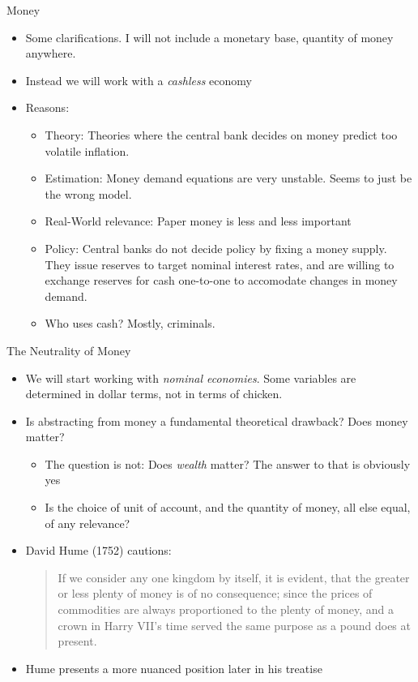 \documentclass[11pt,aspectratio=169,xcolor={dvipsnames},hyperref={pdftex,pdfpagemode=UseNone,hidelinks,pdfdisplaydoctitle=true},usepdftitle=false]{beamer}
\begin{document}
\begin{frame}{Money}
\begin{itemize}
\item Some clarifications. I will not include a monetary base, quantity of money anywhere.
\item Instead we will work with a \textit{cashless} economy
\item Reasons:
\begin{itemize}
\item Theory: Theories where the central bank decides on money predict too volatile inflation.
\item Estimation: Money demand equations are very unstable. Seems to just be the wrong model.
\item Real-World relevance: Paper money is less and less important
\item Policy: Central banks do not decide policy by fixing a money supply. They issue reserves to target nominal interest rates, and are willing to exchange reserves for cash one-to-one to accomodate changes in money demand.
\item Who uses cash? Mostly, criminals.
\end{itemize}
\end{itemize}
\end{frame}

\begin{frame}{The Neutrality of Money}
\begin{itemize}
\item We will start working with \textit{nominal economies}. Some variables are determined in dollar terms, not in terms of chicken.
\item Is abstracting from money a fundamental theoretical drawback? Does money matter?
\begin{itemize}
\item The question is not: Does \textit{wealth} matter? The answer to that is obviously yes
\item Is the choice of unit of account, and the quantity of money, all else equal, of any relevance?
\end{itemize}
\item David Hume (1752) cautions:\\
\begin{quote}
\vspace{0.5cm}
If we consider any one kingdom by itself, it is evident, that the greater or less plenty
of money is of no consequence; since the prices of commodities are always proportioned to
the plenty of money, and a crown in Harry VII's time served the same purpose as a pound
does at present.
\end{quote}
\item Hume presents a more nuanced position later in his treatise
\end{itemize}
\end{frame}
\end{document}
